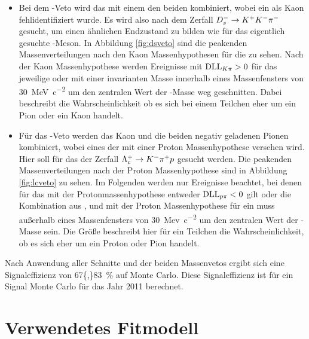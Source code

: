 \begin{itemize}
\item Bei dem \Dsm-Veto wird das \Kp mit einem den beiden \pim kombiniert, wobei ein \pim als Kaon fehlidentifiziert wurde. Es wird also nach dem Zerfall ${{D}^-_{s}}\rightarrow{\ensuremath{{K}^+}}{\ensuremath{{K}^-}}{\ensuremath{{\pi}^-}}$ gesucht, um einen ähnlichen Endzustand zu bilden wie für das eigentlich gesuchte \Dm-Meson. In Abbildung \ref{fig:dsveto} sind die peakenden Massenverteilungen nach den Kaon Massenhypothesen für die \pim zu sehen. Nach der Kaon Massenhypothese werden Ereignisse mit $\mathrm{DLL}_{{K}{\pi}}>0$ für das jeweilige \pim oder mit einer invarianten Masse innerhalb eines Massenfensters von \SI{30}{MeV\per c^2} um den zentralen Wert der \Dsm-Masse weg geschnitten. Dabei beschreibt \dllkpi die Wahrscheinlichkeit ob es sich bei einem Teilchen eher um ein Pion oder ein Kaon handelt.
\item Für das \Lc-Veto werden das Kaon und die beiden negativ geladenen Pionen kombiniert, wobei eines der \pim mit einer Proton Massenhypothese versehen wird. Hier soll für das \Lc der Zerfall ${{\Lambda}^+_{c}}\rightarrow{\ensuremath{{K}^-}}{\ensuremath{{\pi}^+}}{\ensuremath{p}}$ gesucht werden. Die peakenden Massenverteilungen nach der Proton Massenhypothese sind in Abbildung \ref{fig:lcveto} zu sehen. Im Folgenden werden nur Ereignisse beachtet, bei denen für das \pim mit der Protonmassenhypothese entweder $\mathrm{DLL}_{{p}{\pi}}<0$ gilt oder die Kombination aus \Kp, \pim und \pim mit der Proton Massenhypothese für ein \pim muss außerhalb eines Massenfensters von \SI{30}{Mev\per c^2} um den zentralen Wert der \Lc-Masse sein. Die Größe \dllppi beschreibt hier für ein Teilchen die Wahrscheinlichkeit, ob es sich eher um ein Proton oder Pion handelt.
\end{itemize}
Nach Anwendung aller Schnitte und der beiden Massenvetos ergibt sich eine Signaleffizienz von \SI{67{,}83}{\%} auf Monte Carlo. Diese Signaleffizienz ist für ein Signal Monte Carlo für das Jahr \num{2011} berechnet.
 
\section{Verwendetes Fitmodell}

